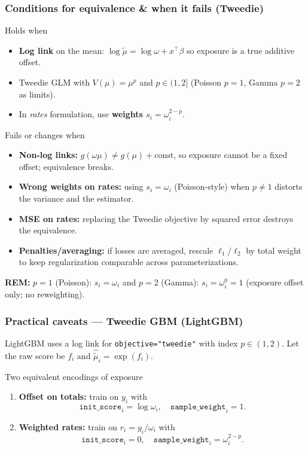 \documentclass[10pt,aspectratio=169,xcolor={dvipsnames},usepdftitle=false]{beamer}
\begin{document}
\begin{frame}
\frametitle{Conditions for equivalence \& when it fails (Tweedie)}
\small
\begin{block}{Holds when}
\begin{itemize}
\item \textbf{Log link} on the mean: $\log \tilde\mu=\log \omega + x^\top\beta$ so exposure is a true additive offset.
\item Tweedie GLM with $V(\mu)=\mu^p$ and $p\in(1,2]$ (Poisson $p{=}1$, Gamma $p{=}2$ as limits).
\item In \emph{rates} formulation, use \textbf{weights $s_i=\omega_i^{2-p}$}.
\end{itemize}
\end{block}
\begin{alertblock}{Fails or changes when}
\begin{itemize}
\item \textbf{Non-log links:}  $g(\omega\mu)\neq g(\mu)+\text{const}$, so exposure cannot be a fixed offset; equivalence breaks.
\item \textbf{Wrong weights on rates:} using $s_i=\omega_i$ (Poisson-style) when $p\neq 1$ distorts the variance and the estimator.
\item \textbf{MSE on rates:} replacing the Tweedie objective by squared error destroys the equivalence.
\item \textbf{Penalties/averaging:} if losses are averaged, rescale $\ell_1/\ell_2$ by total weight to keep regularization comparable across parameterizations.
\end{itemize}
\end{alertblock}


\textbf{REM:} $p{=}1$ (Poisson): $s_i=\omega_i$ and $p{=}2$ (Gamma): $s_i=\omega_i^{0}=1$ (exposure offset only; no reweighting).


\end{frame}

\begin{frame}
\frametitle{Practical caveats — Tweedie GBM (LightGBM)}
\small
LightGBM uses a log link for \texttt{objective="tweedie"} with index $p\in(1,2)$. Let the raw score be $f_i$ and $\hat\tilde\mu_i=\exp(f_i)$.

\begin{block}{Two equivalent encodings of exposure}
\begin{enumerate}
\item \textbf{Offset on totals:} train on $y_i$ with
  \[
  \texttt{init\_score}_i=\log\omega_i,\quad \texttt{sample\_weight}_i=1.
  \]
\item \textbf{Weighted rates:} train on $r_i=y_i/\omega_i$ with
  \[
  \texttt{init\_score}_i=0,\quad \texttt{sample\_weight}_i=\omega_i^{2-p}.
  \]
\end{enumerate}
\end{block}
\end{frame}
\end{document}
